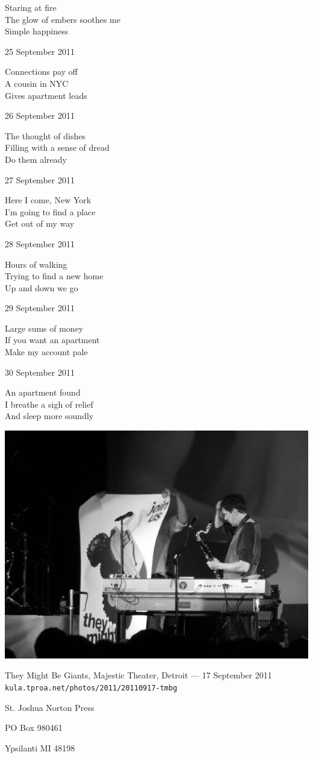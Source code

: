 \documentclass[12pt]{article}
\begin{document}
Staring at fire \\
The glow of embers soothes me \\
Simple happiness

25 September 2011

Connections pay off \\
A cousin in NYC \\
Gives apartment leads

26 September 2011

The thought of dishes \\
Filling with a sense of dread \\
Do them already

27 September 2011

Here I come, New York \\
I'm going to find a place \\
Get out of my way

28 September 2011

Hours of walking \\
Trying to find a new home \\
Up and down we go

29 September 2011

Large sums of money \\
If you want an apartment \\
Make my account pale

30 September 2011

An apartment found \\
I breathe a sigh of relief \\
And sleep more soundly


\newpage

\begin{center}
\includegraphics{tmbg-small.png}

They Might Be Giants, Majestic Theater, Detroit --- 17 September 2011 \\
{\tt kula.tproa.net/photos/2011/20110917-tmbg }
\end{center}


\newpage

\thispagestyle{empty}
\vspace*{12cm}
\begin{sideways}
\Large{St. Joshua Norton Press}
\end{sideways}
\begin{sideways}
\Large{PO Box 980461}
\end{sideways}
\begin{sideways}
\Large{Ypsilanti MI 48198}
\end{sideways}
\end{document}
